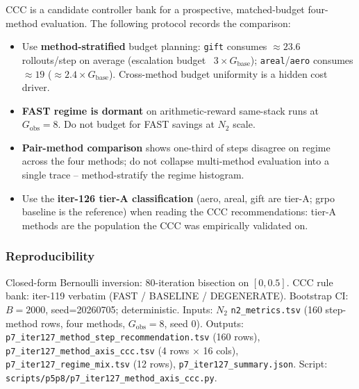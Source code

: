 CCC is a candidate controller bank for a prospective, matched-budget
four-method evaluation. The following protocol records the comparison:
\begin{itemize}
\item Use \textbf{method-stratified} budget planning: \texttt{gift}
  consumes $\approx 23.6$ rollouts/step on average (escalation budget
  ~$3\times G_{\mathrm{base}}$); \texttt{areal}/\texttt{aero} consumes
  $\approx 19$ ($\approx 2.4\times G_{\mathrm{base}}$).  Cross-method
  budget uniformity is a hidden cost driver.
\item \textbf{FAST regime is dormant} on arithmetic-reward same-stack
  runs at $G_{\mathrm{obs}}{=}8$.  Do not budget for FAST savings
  at $N_2$ scale.
\item \textbf{Pair-method comparison} shows one-third of steps
  disagree on regime across the four methods; do not collapse
  multi-method evaluation into a single trace -- method-stratify
  the regime histogram.
\item Use the \textbf{iter-126 tier-A classification} (aero, areal,
  gift are tier-A; grpo baseline is the reference) when reading
  the CCC recommendations: tier-A methods are the population the
  CCC was empirically validated on.
\end{itemize}

\subsubsection*{Reproducibility}

Closed-form Bernoulli inversion: $80$-iteration bisection on
$[0, 0.5]$.  CCC rule bank: iter-119 verbatim (FAST / BASELINE /
DEGENERATE).  Bootstrap CI: $B=2000$, seed=20260705; deterministic.
Inputs: $N_2$ \texttt{n2\_metrics.tsv} (160 step-method rows,
four methods, $G_{\mathrm{obs}}{=}8$, seed 0).  Outputs:
\texttt{p7\_iter127\_method\_step\_recommendation.tsv}
(160 rows), \texttt{p7\_iter127\_method\_axis\_ccc.tsv}
(4 rows $\times$ 16 cols), \texttt{p7\_iter127\_regime\_mix.tsv}
(12 rows), \texttt{p7\_iter127\_summary.json}.  Script:
\texttt{scripts/p5p8/p7\_iter127\_method\_axis\_ccc.py}.
